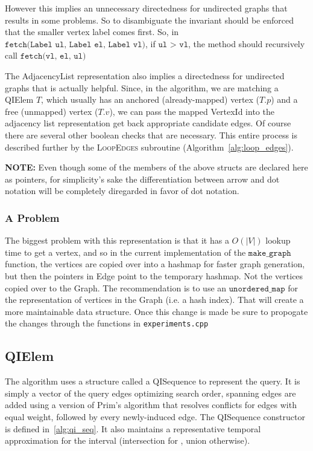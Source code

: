 However this implies an unnecessary directedness for undirected graphs that
results in some problems. So to disambiguate the invariant should be enforced
that the smaller vertex label comes first. So, in $\texttt{fetch(Label ul, Label
  el, Label vl)}$, if $\texttt{ul > vl}$, the method should recursively call
$\texttt{fetch(vl, el, ul)}$ 


The AdjacencyList representation also implies a directedness for undirected
graphs that is actually helpful. Since, in the algorithm, we are matching a
QIElem $T$, which usually has an anchored (already-mapped) vertex ($T.p$) and a
free (unmapped) vertex ($T.v$), we can pass the mapped VertexId into the
adjacency list representation get back appropriate candidate edges. Of course
there are several other boolean checks that are necessary. This entire process
is described further by the \textsc{LoopEdges} subroutine
(Algorithm~\ref{alg:loop_edges}).


\textbf{NOTE:} Even though some of the members of the above structs are declared
here as pointers, for simplicity's sake the differentiation between arrow and
dot notation will be completely diregarded in favor of dot notation.


\subsubsection{A Problem}
The biggest problem with this representation is that it has a $O(|V|)$ lookup
time to get a vertex, and so in the current implementation of the
$\texttt{make\_graph}$ function, the vertices are copied over into a hashmap for
faster graph generation, but then the pointers in Edge point to the temporary
hashmap. Not the vertices copied over to the Graph. The recommendation is to use
an $\texttt{unordered\_map}$ for the representation of vertices in the Graph
(i.e. a hash index). That will create a more maintainable data structure. Once
this change is made be sure to propogate the changes through the functions in
\texttt{experiments.cpp}


\subsection{QIElem}

The algorithm uses a structure called a QISequence to represent the query. It is
simply a vector of the query edges optimizing search order, spanning edges are
added using a version of Prim's algorithm that resolves conflicts for edges with
equal weight, followed by every newly-induced edge. The QISequence constructor
is defined in~\ref{alg:qi_seq}. It also maintains a representative temporal
approximation for the interval (intersection for \concur, union otherwise).

